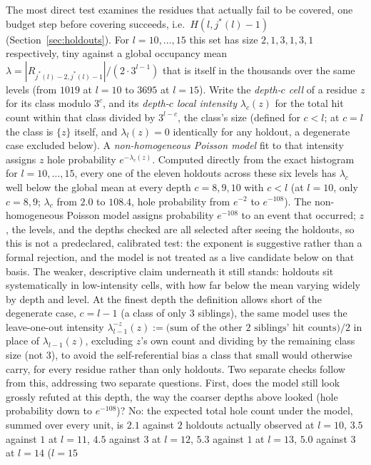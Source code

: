 \documentclass[11pt]{amsart}
\theoremstyle{plain}
\theoremstyle{definition}
\theoremstyle{remark}
\begin{document}
The most direct test examines the residues that actually fail to be covered, one budget step
before covering succeeds, i.e.\ $H(l,j^*(l)-1)$ (Section~\ref{sec:holdouts}). For $l=10,\dots,15$
this set has size $2,1,3,1,3,1$ respectively, tiny against a global occupancy mean
$\lambda=|R_{j^*(l)-2,j^*(l)-1}|/(2\cdot3^{l-1})$ that is itself in the thousands over the same
levels (from $1019$ at $l=10$ to $3695$ at $l=15$). Write the \emph{depth-$c$ cell} of a residue $z$
for its class modulo $3^c$, and its \emph{depth-$c$ local intensity} $\lambda_c(z)$ for the total
hit count within that class divided by $3^{l-c}$, the class's size (defined for $c<l$; at $c=l$ the
class is $\{z\}$ itself, and $\lambda_l(z)=0$ identically for any holdout, a degenerate case excluded
below). A \emph{non-homogeneous Poisson model} fit to that intensity assigns $z$ hole probability
$e^{-\lambda_c(z)}$. Computed directly from the exact histogram for $l=10,\dots,15$, every one of the
eleven holdouts across these six levels has $\lambda_c$ well below the global mean at every depth
$c=8,9,10$ with $c<l$ (at $l=10$, only $c=8,9$; $\lambda_c$ from $2.0$ to $108.4$, hole probability
from $e^{-2}$ to $e^{-108}$). The non-homogeneous Poisson model assigns probability $e^{-108}$ to an
event that occurred; $z$, the levels, and the depths checked are all selected after seeing the
holdouts, so this is not a predeclared, calibrated test: the exponent is suggestive rather than a
formal
rejection, and the model is not treated as a live candidate below on that basis. The weaker,
descriptive claim
underneath it still stands:
holdouts sit systematically in low-intensity cells, with how far below the mean varying widely by
depth and level. At the finest depth the definition allows short of the degenerate case, $c=l-1$ (a
class of only $3$ siblings), the same model uses the leave-one-out intensity
$\lambda_{l-1}^{-z}(z):=\bigl(\text{sum of the other $2$ siblings' hit counts}\bigr)/2$ in place of
$\lambda_{l-1}(z)$, excluding $z$'s own count and dividing by the remaining class size (not $3$), to
avoid the self-referential bias a class that small would otherwise carry, for every residue rather
than only holdouts. Two separate checks follow from this, addressing two separate questions. First,
does the model still look grossly refuted at this depth, the way the coarser depths above looked
(hole probability down to $e^{-108}$)? No: the expected total hole count under the model, summed
over every unit, is $2.1$ against $2$ holdouts actually observed at $l=10$, $3.5$ against $1$ at
$l=11$, $4.5$ against $3$ at $l=12$, $5.3$ against $1$ at $l=13$, $5.0$ against $3$ at $l=14$ ($l=15$
\end{document}
